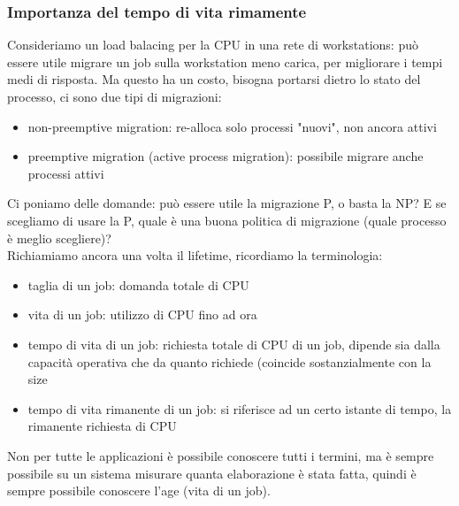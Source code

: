 \documentclass{article}
\begin{document}
\subsubsection{Importanza del tempo di vita rimamente}
Consideriamo un load balacing per la CPU in una rete di workstations: può essere utile migrare un job sulla workstation meno carica, per migliorare i tempi medi di risposta. Ma questo ha un costo, bisogna portarsi dietro lo stato del processo, ci sono due tipi di migrazioni:
\begin{itemize}
\item non-preemptive migration: re-alloca solo processi "nuovi", non ancora attivi
\item preemptive migration (active process migration): possibile migrare anche processi attivi
\end{itemize}
Ci poniamo delle domande: può essere utile la migrazione P, o basta la NP? E se scegliamo di usare la P, quale è una buona politica di migrazione (quale processo è meglio scegliere)?\\ Richiamiamo ancora una volta il lifetime, ricordiamo la terminologia:
\begin{itemize}
\item taglia di un job: domanda totale di CPU
\item vita di un job: utilizzo di CPU fino ad ora
\item tempo di vita di un job: richiesta totale di CPU di un job, dipende sia dalla capacità operativa che da quanto richiede (coincide sostanzialmente con la size
\item tempo di vita rimanente di un job: si riferisce ad un certo istante di tempo, la rimanente richiesta di CPU
\end{itemize}
Non per tutte le applicazioni è possibile conoscere tutti i termini, ma è sempre possibile su un sistema misurare quanta elaborazione è stata fatta, quindi è sempre possibile conoscere l'age (vita di un job).\\ 
\end{document}
